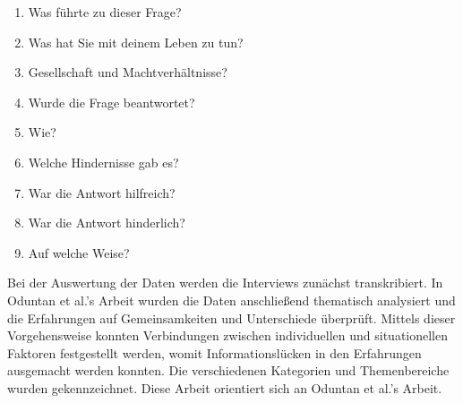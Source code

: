 \begin{enumerate}
    \item Was f\"uhrte zu dieser Frage?
    \item Was hat Sie mit deinem Leben zu tun?
    \item Gesellschaft und Machtverh\"altnisse?
    \item Wurde die Frage beantwortet?
    \item Wie?
    \item Welche Hindernisse gab es?
    \item War die Antwort hilfreich?
    \item War die Antwort hinderlich?
    \item Auf welche Weise?
\end{enumerate}




Bei der Auswertung der Daten werden die Interviews zun\"achst transkribiert. In Oduntan et al.'s Arbeit wurden die Daten anschlie\ss{}end thematisch analysiert und die Erfahrungen auf Gemeinsamkeiten und Unterschiede \"uberpr\"uft. Mittels dieser Vorgehensweise konnten Verbindungen zwischen individuellen und situationellen Faktoren festgestellt werden, womit Informationsl\"ucken in den Erfahrungen ausgemacht werden konnten. Die verschiedenen Kategorien und Themenbereiche wurden gekennzeichnet.\cite{oduntan2017investigating} Diese Arbeit orientiert sich an Oduntan et al.'s Arbeit.

